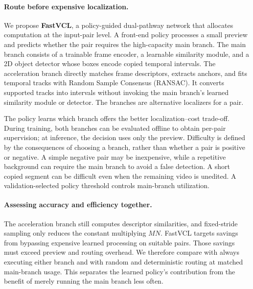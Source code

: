 \paragraph{Route before expensive localization.}
We propose \textbf{FastVCL}, a policy-guided dual-pathway network that allocates computation
at the input-pair level. A front-end policy processes a small preview and predicts whether
the pair requires the high-capacity main branch. The main branch consists of a trainable
frame encoder, a learnable similarity module, and a 2D object detector whose boxes encode
copied temporal intervals. The acceleration branch directly matches frame descriptors,
extracts anchors, and fits temporal tracks with Random Sample Consensus (RANSAC). It converts
supported tracks into intervals without invoking the main branch's learned similarity module
or detector. The branches are alternative localizers for a pair.

The policy learns which branch offers the better localization--cost trade-off. During
training, both branches can be evaluated offline to obtain per-pair supervision; at inference,
the decision uses only the preview. Difficulty is defined by the consequences of choosing a
branch, rather than whether a pair is positive or negative. A simple negative pair may be
inexpensive, while a repetitive background can require the main branch to avoid a false
detection. A short copied segment can be difficult even when the remaining video is unedited.
A validation-selected policy threshold controls main-branch utilization.

\paragraph{Assessing accuracy and efficiency together.}
The acceleration branch still computes descriptor similarities, and fixed-stride sampling
only reduces the constant multiplying $MN$. FastVCL targets savings from bypassing expensive
learned processing on suitable pairs. Those savings must exceed preview and routing overhead.
We therefore compare with always executing either branch and with random and deterministic
routing at matched main-branch usage. This separates the learned policy's contribution from
the benefit of merely running the main branch less often.

